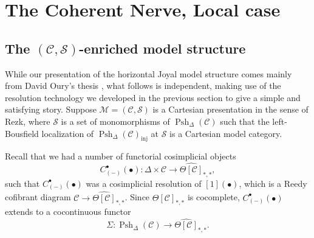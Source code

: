 \documentclass[leqno]{article}
\numberwithin{equation}{subsection}
\theoremstyle{plain}   %
\theoremstyle{remark}
\theoremstyle{plain}
\providecommand{\C}{}
\renewcommand{\C}{\ensuremath{\mathcal{C}}}
\newcommand{\M}{\ensuremath{\mathcal{M}}}
\newcommand{\setS}{\ensuremath{\mathscr{S}}}
\newcommand{\cellset}{\ensuremath{\widehat{\Theta[\mathcal{C}]}}}
\newcommand{\spsh}{\ensuremath{\operatorname{Psh}_\Delta(\mathcal{C})}}
\begin{document}
\section{The Coherent Nerve, Local case}
\subsection{The \((\C,\setS)\)-enriched model structure}\label{rezkvert}
While our presentation of the horizontal Joyal model structure comes mainly from David Oury's thesis \cite{oury}, what follows is independent, making use of the resolution technology we developed in the previous section to give a simple and satisfying story. Suppose \(\M=(\C,\setS)\) is a Cartesian presentation in the sense of Rezk, where \(\setS\) is a set of monomorphisms of \(\spsh\) such that the left-Bousfield localization of \(\spsh_\mathrm{inj}\) at \(\setS\) is a Cartesian model category.  

Recall that we had a number of functorial cosimplicial objects \[C_{(-)}^\bullet(\bullet):\Delta \times \C \to \cellset_{\ast,\ast},\] such that \(C_{(-)}^\bullet(\bullet)\) was a cosimplicial resolution of \([1](\bullet)\), which is a Reedy cofibrant diagram \(\C\to \cellset_{\ast,\ast}\).  Since \(\cellset_{\ast,\ast}\) is cocomplete, \(C_{(-)}^\bullet(\bullet)\) extends to a cocontinuous functor \[\Sigma:\spsh\to \cellset_{\ast,\ast}.\]  
\end{document}
